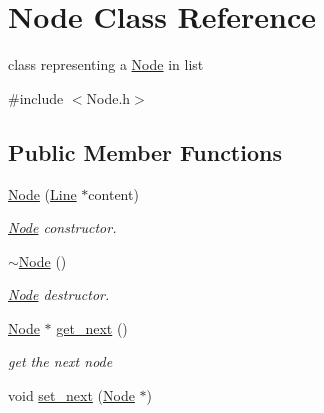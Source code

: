 \hypertarget{class_node}{\section{Node Class Reference}
\label{class_node}
}


class representing a \hyperlink{class_node}{Node} in list  




{\ttfamily \#include $<$Node.\-h$>$}

\subsection*{Public Member Functions}
\begin{DoxyCompactItemize}
\item 
\hypertarget{class_node_a38b4c6850bd8b7f57986ab2131b09918}{\hyperlink{class_node_a38b4c6850bd8b7f57986ab2131b09918}{Node} (\hyperlink{class_line}{Line} $\ast$content)}\label{class_node_a38b4c6850bd8b7f57986ab2131b09918}

\begin{DoxyCompactList}\small\item\em \hyperlink{class_node}{Node} constructor. \end{DoxyCompactList}\item 
\hypertarget{class_node_aa0840c3cb5c7159be6d992adecd2097c}{\hyperlink{class_node_aa0840c3cb5c7159be6d992adecd2097c}{$\sim$\-Node} ()}\label{class_node_aa0840c3cb5c7159be6d992adecd2097c}

\begin{DoxyCompactList}\small\item\em \hyperlink{class_node}{Node} destructor. \end{DoxyCompactList}\item 
\hypertarget{class_node_a815c897407e2c039c4d86ef42848d8e5}{\hyperlink{class_node}{Node} $\ast$ \hyperlink{class_node_a815c897407e2c039c4d86ef42848d8e5}{get\-\_\-next} ()}\label{class_node_a815c897407e2c039c4d86ef42848d8e5}

\begin{DoxyCompactList}\small\item\em get the next node \end{DoxyCompactList}\item 
\hypertarget{class_node_afdf4d8e60306222a592c1403410c176f}{void \hyperlink{class_node_afdf4d8e60306222a592c1403410c176f}{set\-\_\-next} (\hyperlink{class_node}{Node} $\ast$)}\label{class_node_afdf4d8e60306222a592c1403410c176f}


\end{DoxyCompactItemize}
